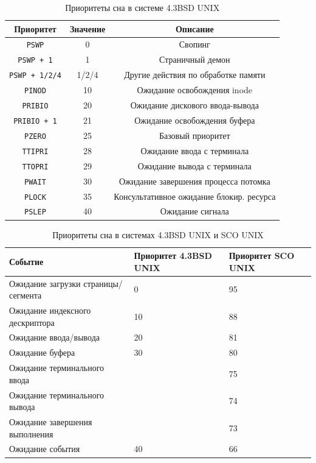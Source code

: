 \newpage
\begin{table}[h]
	\caption{Приоритеты сна в системе 4.3BSD UNIX}
	\label{tab:bsd}
	\begin{center}
		\begin{tabular}{ |c|c|c|  }
			\hline
			\textbf{Приоритет} & \textbf{Значение} & \textbf{Описание} \\
			\hline
			\texttt{PSWP} & 0 & Свопинг \\
			\hline
			\texttt{PSWP + 1} & 1 & Страничный демон \\
			\hline
			\texttt{PSWP + 1/2/4} & 1/2/4 & Другие действия по обработке памяти \\
			\hline
			\texttt{PINOD} & 10 & Ожидание освобождения inode \\
			\hline
			\texttt{PRIBIO} & 20 & Ожидание дискового ввода-вывода \\
			\hline
			\texttt{PRIBIO + 1} & 21 & Ожидание освобождения буфера \\
			\hline
			\texttt{PZERO} & 25 & Базовый приоритет \\
			\hline
			\texttt{TTIPRI} & 28 & Ожидание ввода с терминала \\
			\hline
			\texttt{TTOPRI} & 29 & Ожидание вывода с терминала \\
			\hline 
			\texttt{PWAIT} & 30 & Ожидание завершения процесса потомка \\
			\hline
			\texttt{PLOCK} & 35 & Консультативное ожидание блокир. ресурса \\
			\hline
			\texttt{PSLEP} & 40 & Ожидание сигнала \\
			\hline
		\end{tabular}
	\end{center}
\end{table}

\begin{table}[h]
	\caption{Приоритеты сна в системах 4.3BSD UNIX и SCO UNIX}
	\begin{center}
		\begin{tabular}{|l|p{75pt}|p{75pt}|} 
			\hline
			\textbf{Событие} & \textbf{Приоритет 4.3BSD UNIX} & \textbf{Приоритет SCO UNIX}\\
			\hline
			{Ожидание загрузки страницы/сегмента} & 0 & 95\\
			\hline
			{Ожидание индексного дескриптора} & 10 & 88\\
			\hline
			{Ожидание ввода/вывода} & 20 & 81 \\
			\hline
			{Ожидание буфера} & 30 & 80\\
			\hline
			{Ожидание терминального ввода} &    & 75\\
			\hline
			{Ожидание терминального вывода} &    & 74\\
			\hline
			{Ожидание завершения выполнения} &    & 73\\
			\hline
			{Ожидание события} & 40 & 66\\
			\hline
		\end{tabular}
	\end{center}
	\label{tbl:sleeppriority}
\end{table}


